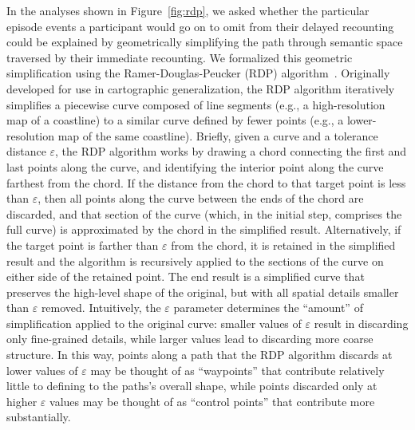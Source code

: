 \documentclass[10pt]{article}
\begin{document}
In the analyses shown in Figure~\ref{fig:rdp}, we asked whether the particular episode events a participant would go on to omit from their delayed recounting could be explained by geometrically simplifying the path through semantic space traversed by their immediate recounting.
We formalized this geometric simplification using the Ramer-Douglas-Peucker (RDP) algorithm~\citep{Rame72,DougPeuc73}.
Originally developed for use in cartographic generalization, the RDP algorithm iteratively simplifies a piecewise curve composed of line segments (e.g., a high-resolution map of a coastline) to a similar curve defined by fewer points (e.g., a lower-resolution map of the same coastline).
Briefly, given a curve and a tolerance distance $\varepsilon$, the RDP algorithm works by drawing a chord connecting the first and last points along the curve, and identifying the interior point along the curve farthest from the chord.
If the distance from the chord to that target point is less than $\varepsilon$, then all points along the curve between the ends of the chord are discarded, and that section of the curve (which, in the initial step, comprises the full curve) is approximated by the chord in the simplified result.
Alternatively, if the target point is farther than $\varepsilon$ from the chord, it is retained in the simplified result and the algorithm is recursively applied to the sections of the curve on either side of the retained point.
The end result is a simplified curve that preserves the high-level shape of the original, but with all spatial details smaller than $\varepsilon$ removed.
Intuitively, the $\varepsilon$ parameter determines the ``amount'' of simplification applied to the original curve: smaller values of $\varepsilon$ result in discarding only fine-grained details, while larger values lead to discarding more coarse structure.
In this way, points along a path that the RDP algorithm discards at lower values of $\varepsilon$ may be thought of as ``waypoints'' that contribute relatively little to defining to the paths's overall shape, while points discarded only at higher $\varepsilon$ values may be thought of as ``control points'' that contribute more substantially.
\end{document}
